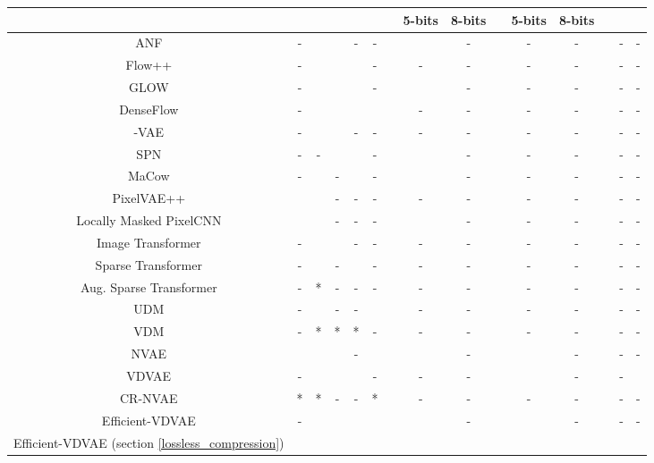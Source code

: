 \documentclass{article}
\begin{document}
\begin{table}[]
{\begin{tabular}{@{}ccccccccccccccc@{}}
 &  &  &  &  &  &  & 5-bits & 8-bits &  & 5-bits & 8-bits &  &  &  \\ 
 \midrule
ANF\cite{anf} & - &  &  & - & - &  &  & - &  & - & - &  & - & - \\
Flow++\cite{flow++} & - &  &  &  & - &  & - & - &  & - & - &  & - & - \\
GLOW\cite{kingma2018glow} & - &  &  &  & - &  &  & - &  & - & - &  & - & - \\
DenseFlow\cite{denseflow} & - &  &  &  &  &  & - & - &  & - & - &  & - & - \\
\midrule
-VAE\cite{delta_vae} & - &  &  & - & - &  & - & - &  & - & - &  & - & - \\
SPN\cite{spn} & - & - &  &  & - &  &  & - &  & - & - &  & - & - \\
MaCow\cite{ma2019macow} & - &  & - &  & - &  &  & - &  & - & - &  & - & - \\
PixelVAE++\cite{sadeghi2019pixelvae++} &  &  & - & - & - &  & - & - &  & - & - &  & - & - \\
Locally Masked PixelCNN\cite{locally} &  &  & - & - & - &  &  & - &  & - & - &  & - & - \\
Image Transformer\cite{image} & - &  &  & - & - &  & - & - &  & - & - &  & - & - \\
Sparse Transformer\cite{child2019generating} & - &  & - &  & - &  & - & - &  & - & - &  & - & - \\
Aug. Sparse Transformer\cite{augmented_sparse_transformer} & - & * & - & - & - &  & - & - &  & - & - &  & - & - \\
\midrule
UDM\cite{udm_paper} & - &  & - & - &  &  & - & - &  & - & - &  & - & - \\
VDM\cite{kingma2021variational} & - & * & * & * & - &  & - & - &  & - & - &  & - & - \\
\midrule
NVAE\cite{vahdat2020nvae} &  &  &  & - &  &  &  & - &  &  & - &  & - & - \\
VDVAE\cite{child2021very} & - &  &  &  & - &  & - & - &  &  & - &  & - &  \\
CR-NVAE\cite{sinha2021consistency} & * & * & - & - & * &  & - & - &  & - & - &  & - & - \\
\midrule
Efficient-VDVAE & - &  &  &  &  &  &  & - &  &  & - &  & - & - \\
Efficient-VDVAE (section \ref{lossless_compression}) &  &  &  &  &  &  &  &  &  &  &  &  &  &  \\ 
\bottomrule
\end{tabular}}
\end{table}
\end{document}
